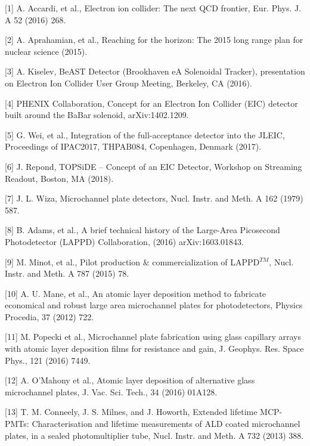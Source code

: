 \documentclass[preprint,5p]{elsarticle}
\begin{document}
\begin{thebibliography}{00}

[1] A. Accardi, et al., Electron ion collider: The next QCD frontier, Eur. Phys. J. A 52 (2016) 268.

[2] A. Aprahamian, et al., Reaching for the horizon: The 2015 long range plan for nuclear science (2015).

[3] A. Kiselev, BeAST Detector (Brookhaven eA Solenoidal Tracker), presentation on Electron Ion Collider User Group Meeting, Berkeley, CA (2016).

[4] PHENIX Collaboration, Concept for an Electron Ion Collider (EIC) detector built around the BaBar solenoid, arXiv:1402.1209.

[5] G. Wei, et al., Integration of the full-acceptance detector into the JLEIC, Proceedings of IPAC2017, THPAB084, Copenhagen, Denmark (2017).

[6] J. Repond, TOPSiDE – Concept of an EIC Detector, Workshop on Streaming Readout, Boston, MA (2018).

[7] J. L. Wiza, Microchannel plate detectors, Nucl. Instr. and Meth. A 162 (1979) 587.

[8] B. Adams, et al., A brief technical history of the Large-Area Picosecond Photodetector (LAPPD) Collaboration, (2016) arXiv:1603.01843.

   [9] M. Minot, et al., Pilot production \& commercialization of LAPPD$^{𝑇𝑀}$, 
      Nucl.  Instr. and Meth. A 787 (2015) 78.

[10] A. U. Mane, et al., An atomic layer deposition method to fabricate economical and robust large area microchannel plates for photodetectors, Physics Procedia, 37 (2012) 722.

[11] M. Popecki et al., Microchannel plate fabrication using glass capillary arrays with atomic layer deposition films for resistance and gain, J. Geophys. Res. Space Phys., 121 (2016) 7449.

[12] A. O'Mahony et al., Atomic layer deposition of alternative glass microchannel plates, J. Vac. Sci. Tech., 34 (2016) 01A128.

[13] T. M. Conneely, J. S. Milnes, and J. Howorth, Extended lifetime MCP-PMTs: Characterisation and lifetime measurements of ALD coated microchannel plates, in a sealed photomultiplier tube, Nucl. Instr. and Meth. A 732 (2013) 388.


\end{thebibliography}
\end{document}
